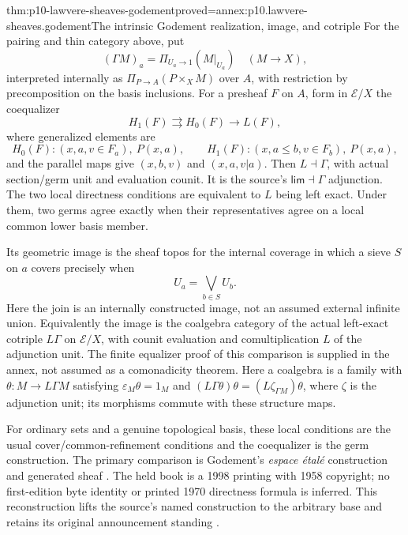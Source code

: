 \begin{hbtheorem}{thm:p10-lawvere-sheaves-godement}{proved=annex:p10.lawvere-sheaves.godement}{The intrinsic Godement realization, image, and cotriple}
For the pairing and thin category above, put
\[
       (\Gamma M)_a=\Pi_{U_a\to1}(M|_{U_a})
                  \quad(M\to X),
\]
interpreted internally as \(\Pi_{P\to A}(P\times_XM)\)
over \(A\), with restriction by precomposition on the basis
inclusions.  For a presheaf \(F\) on \(A\), form in
\(\mathcal E/X\) the coequalizer
\[
 H_1(F)\rightrightarrows H_0(F)\longrightarrow L(F),
\]
where generalized elements are
\[
 H_0(F): (x,a,v\in F_a),\ P(x,a),
 \qquad H_1(F):(x,a\leq b,v\in F_b),\ P(x,a),
\]
and the parallel maps give \((x,b,v)\) and
\((x,a,v|a)\).  Then \(L\dashv\Gamma\), with actual
section/germ unit and evaluation counit.  It is the source's
\(\mathsf{lim}\dashv\Gamma\) adjunction.  The two local
directness conditions are equivalent to \(L\) being left exact.
Under them, two germs agree exactly when their representatives
agree on a local common lower basis member.

Its geometric image is the sheaf topos for the internal coverage
in which a sieve \(S\) on \(a\) covers precisely when
\[
                           U_a=\bigvee_{b\in S}U_b.
\]
Here the join is an internally constructed image, not an assumed
external infinite union.  Equivalently the image is the coalgebra
category of the actual left-exact cotriple \(L\Gamma\) on
\(\mathcal E/X\), with counit evaluation and comultiplication
\(L\) of the adjunction unit.  The finite equalizer proof of
this comparison is supplied in the annex, not assumed as a
comonadicity theorem.
Here a coalgebra is a family with \(\theta:M\to L\Gamma M\)
satisfying \(\varepsilon_M\theta=1_M\) and
\((L\Gamma\theta)\theta=(L\zeta_{\Gamma M})\theta\),
where \(\zeta\) is the adjunction unit; its morphisms commute
with these structure maps.

For ordinary sets and a genuine topological basis, these local
conditions are the usual cover/common-refinement conditions and
the coequalizer is the germ construction.  The primary comparison
is Godement's \emph{espace \'etal\'e} construction and generated
sheaf \cite[II\S1.2, pp.~110--112]{Godement1998Printing}.
The held book is a 1998 printing with 1958 copyright; no first-edition
byte identity or printed 1970 directness formula is inferred.
This reconstruction lifts the source's named construction to the
arbitrary base and retains its original announcement standing
\cite[pp.~331--332]{Lawvere1970}.
\end{hbtheorem}

